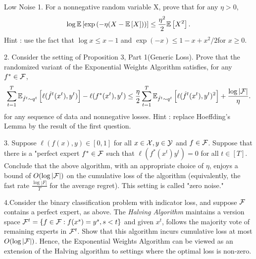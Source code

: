 \begin{exercise}[]{Low Noise}
1. For a nonnegative random variable X, prove that for any $ \eta >0 $,
\begin{equation*}
	\log \EE{\exp{(- \eta (X - \EE{X}))}} \leq  \frac{\eta^2}{2}\EE{X^2}.
\end{equation*}
Hint : use the fact that $ \log x \leq x-1 $ and $ \exp(-x) \leq 1 - x + x^2/2 $for $ x\geq 0 $.

2. Consider the setting of Proposition 3, Part 1(Generic Loss). Prove that the randomized variant of the Exponential
Weights Algorithm satisfies, for any $ f^{*} \in \F $,
\begin{equation*}
	\sum_{t=1}^{T}\EEs{\ell(\hat{f}^{t}(x^t),y^t)}{\hat{f}^{t}\sim q^{t}} - \ell(f^{*}(x^t),y^t) \leq
	\frac{\eta}{2}\sum_{t=1}^{T}\EEs{\ell(\hat{f}^{t}(x^t),y^t)^2}{\hat{f}^{t}\sim q^{t}} + \frac{\log |\F|}{\eta}.
\end{equation*}
for any sequence of data and nonnegative losses. Hint : replace Hoeffding's Lemma by the result of the first question.

3. Suppose $ \ell(f(x),y) \in [0,1] $ for all $ x \in \X, y \in \Y $ and $ f\in \F $. Suppose that there is a "perfect
expert $ f^{*}\in \F $ such that $ \ell(f^{*}(x^t)y^t) = 0 $ for all $ t\in [T] $. Conclude that the above algorithm,
with an appropriate choice of $ \eta $, enjoys a bound of $ O(\log |\F|) $ on the cumulative loss of the algorithm
(equivalently, the fast rate $ \frac{\log |F|}{T} $ for the average regret). This setting is called "zero noise."

4.Consider the binary classification problem with indicator loss, and suppose $ \F $ contains a perfect expert, as
above. The \textit{Halving Algorithm} maintains a version space $ \F^{t} = \{ f \in \F : f(x^s)=y^s, s<t \} $ and given
$ x^{t} $, follows the majority vote of remaining experts in $ \F^{t} $. Show that this algorithm incurs cumulative loss
at most $ O(\log |\F|) $. Hence, the Exponential Weights Algorithm can be viewed as an extension of the Halving
algorithm to settings where the optimal loss is non-zero.

\end{exercise}

